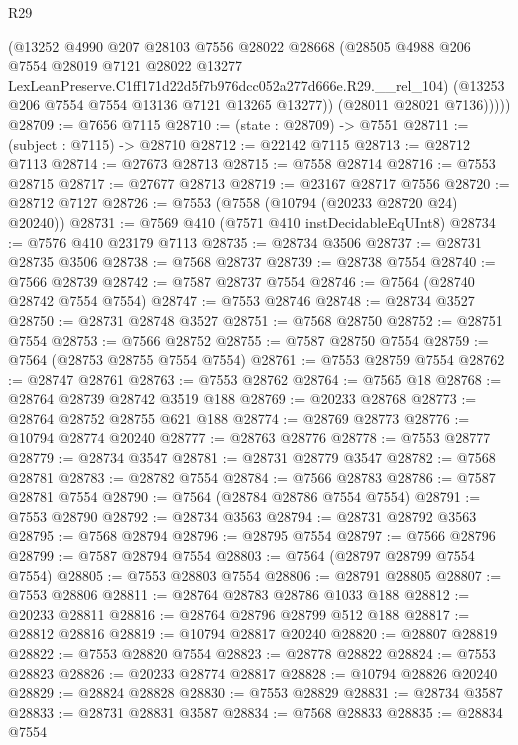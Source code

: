 \begin{lexlean}{R29}
\begin{coremodule}
            (@13252
              @4990
              @207
              @28103
              @7556
              @28022
              @28668
              (@28505
                @4988
                @206
                @7554
                @28019
                @7121
                @28022
                @13277
                LexLeanPreserve.C1ff171d22d5f7b976dcc052a277d666e.R29.__rel_104)
              (@13253 @206 @7554 @7554 @13136 @7121 @13265 @13277))
            (@28011 @28021 @7136)))))
@28709 := @7656 @7115
@28710 := (state : @28709) -> @7551
@28711 := (subject : @7115) -> @28710
@28712 := @22142 @7115
@28713 := @28712 @7113
@28714 := @27673 @28713
@28715 := @7558 @28714
@28716 := @7553 @28715
@28717 := @27677 @28713
@28719 := @23167 @28717 @7556
@28720 := @28712 @7127
@28726 := @7553 (@7558 (@10794 (@20233 @28720 @24) @20240))
@28731 := @7569 @410 (@7571 @410 instDecidableEqUInt8)
@28734 := @7576 @410 @23179 @7113
@28735 := @28734 @3506
@28737 := @28731 @28735 @3506
@28738 := @7568 @28737
@28739 := @28738 @7554
@28740 := @7566 @28739
@28742 := @7587 @28737 @7554
@28746 := @7564 (@28740 @28742 @7554 @7554)
@28747 := @7553 @28746
@28748 := @28734 @3527
@28750 := @28731 @28748 @3527
@28751 := @7568 @28750
@28752 := @28751 @7554
@28753 := @7566 @28752
@28755 := @7587 @28750 @7554
@28759 := @7564 (@28753 @28755 @7554 @7554)
@28761 := @7553 @28759 @7554
@28762 := @28747 @28761
@28763 := @7553 @28762
@28764 := @7565 @18
@28768 := @28764 @28739 @28742 @3519 @188
@28769 := @20233 @28768
@28773 := @28764 @28752 @28755 @621 @188
@28774 := @28769 @28773
@28776 := @10794 @28774 @20240
@28777 := @28763 @28776
@28778 := @7553 @28777
@28779 := @28734 @3547
@28781 := @28731 @28779 @3547
@28782 := @7568 @28781
@28783 := @28782 @7554
@28784 := @7566 @28783
@28786 := @7587 @28781 @7554
@28790 := @7564 (@28784 @28786 @7554 @7554)
@28791 := @7553 @28790
@28792 := @28734 @3563
@28794 := @28731 @28792 @3563
@28795 := @7568 @28794
@28796 := @28795 @7554
@28797 := @7566 @28796
@28799 := @7587 @28794 @7554
@28803 := @7564 (@28797 @28799 @7554 @7554)
@28805 := @7553 @28803 @7554
@28806 := @28791 @28805
@28807 := @7553 @28806
@28811 := @28764 @28783 @28786 @1033 @188
@28812 := @20233 @28811
@28816 := @28764 @28796 @28799 @512 @188
@28817 := @28812 @28816
@28819 := @10794 @28817 @20240
@28820 := @28807 @28819
@28822 := @7553 @28820 @7554
@28823 := @28778 @28822
@28824 := @7553 @28823
@28826 := @20233 @28774 @28817
@28828 := @10794 @28826 @20240
@28829 := @28824 @28828
@28830 := @7553 @28829
@28831 := @28734 @3587
@28833 := @28731 @28831 @3587
@28834 := @7568 @28833
@28835 := @28834 @7554

\end{coremodule}
\end{lexlean}
